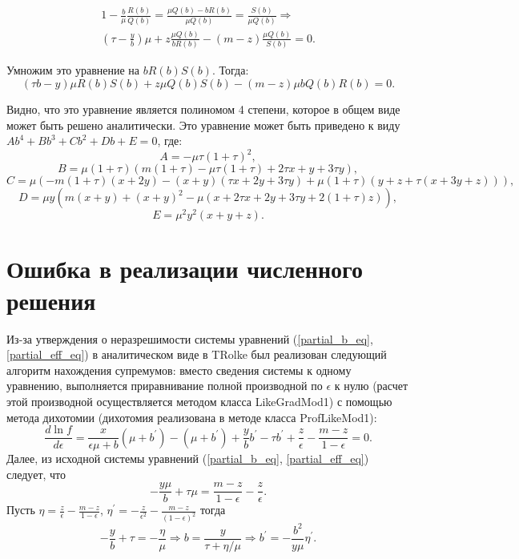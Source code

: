 \documentclass[14pt]{article}
\begin{document}
\begin{equation}
\begin{split}
      1 - \frac{b}{\mu} \frac{R(b)}{Q(b)} = \frac{\mu Q(b) - b R(b)}{\mu Q(b)} = \frac{S(b)}{\mu Q(b)} \Rightarrow \\
       \left(\tau - \frac{y}{b}\right) \mu + z\frac{\mu Q(b)}{b R(b)} - \left(m -z\right) \frac{\mu Q(b)}{S(b)} = 0 .
\end{split}
\end{equation}

Умножим это уравнение на $b R(b) S(b)$. Тогда:
$$\left(\tau b - y \right) \mu R(b) S(b) + z \mu Q(b)S(b) - (m-z) \mu b Q(b) R(b) = 0 .$$

Видно, что это уравнение является полиномом 4 степени, которое в общем виде может быть решено аналитически.
 Это уравнение может быть приведено к виду
$A b^4 + B b^3 + C b^2 + D b + E =0$, где:
$$A = - \mu \tau \left(1 + \tau\right)^2 ,$$
$$B = \mu (1+\tau) (m (1+\tau)-\mu \tau (1+\tau)+2 \tau x+y+3 \tau y) ,$$ 
$$C = \mu(-m (1+\tau) (x+2 y)-(x+y) (\tau x+2 y+3 \tau y)+\mu (1+\tau) (y+z+\tau (x+3 y+z))) ,$$
$$D = \mu y \left(m (x+y)+(x+y)^2-\mu (x+2 \tau x+2 y+3 \tau y+2 (1+\tau) z)\right) ,$$
$$E = \mu^2 y^2 (x + y + z) .$$



\section{Ошибка в реализации численного решения}

Из-за утверждения о неразрешимости системы уравнений (\ref{partial_b_eq}, \ref{partial_eff_eq}) в аналитическом виде в TRolke \cite{TRolke, ROOT} был реализован следующий алгоритм нахождения супремумов: %
вместо сведения системы к одному уравнению,  выполняется приравнивание полной производной по $\epsilon$ к нулю (расчет этой производной осуществляется методом класса LikeGradMod1) с помощью метода дихотомии (дихотомия реализована в методе класса ProfLikeMod1):
$$\frac{d \ln f}{d \epsilon} = \frac{x}{\epsilon \mu + b} \left(\mu + b^\prime\right) -  \left(\mu + b^\prime\right) + \frac{y}{b} b^\prime - \tau b^\prime + \frac{z}{\epsilon} - \frac{m -z}{1 - \epsilon} = 0 .$$ 
Далее, из исходной системы уравнений (\ref{partial_b_eq}, \ref{partial_eff_eq}) следует, что
$$-\frac{y \mu}{b} +\tau \mu = \frac{m-z}{1-\epsilon} - \frac{z}{\epsilon} .$$
Пусть $\eta = \frac{z}{\epsilon} - \frac{m-z}{1-\epsilon}$, $\eta^\prime = - \frac{z}{\epsilon^2} - \frac{m-z}{\left(1-\epsilon\right)^2}$ тогда  
$$-\frac{y}{b} +\tau = - \frac{\eta}{\mu} \Rightarrow b = \frac{y}{\tau + \eta / \mu} \Rightarrow  b^\prime = - \frac{b^2}{y \mu} \eta^\prime .$$
\end{document}
